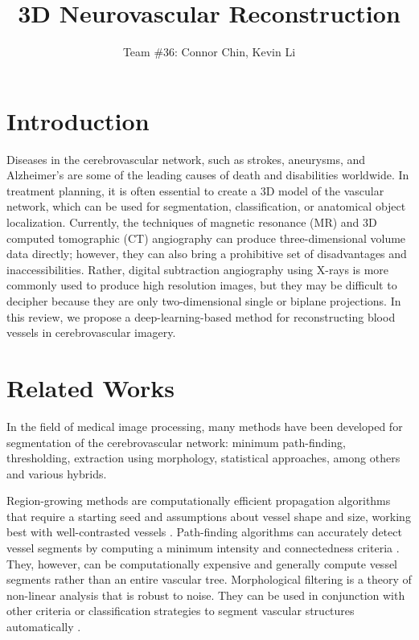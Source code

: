 \documentclass[letterpaper, 10 pt, journal]{ieeeconf}
\title{\LARGE \bf 3D Neurovascular Reconstruction}
\author{Team \#36: Connor Chin, Kevin Li}
\begin{document}
\maketitle
\thispagestyle{empty}
\pagestyle{empty}

\section{Introduction}

Diseases in the cerebrovascular network, such as strokes, aneurysms, and Alzheimer’s are some of the leading causes of death and disabilities worldwide.
In treatment planning, it is often essential to create a 3D model of the vascular network, which can be used for segmentation, classification, or anatomical object localization.
Currently, the techniques of magnetic resonance (MR) and 3D computed tomographic (CT) angiography can produce three-dimensional volume data directly;
however, they can also bring a prohibitive set of disadvantages and inaccessibilities.
Rather, digital subtraction angiography using X-rays is more commonly used to produce high resolution images, but they may be difficult to decipher because they are only two-dimensional single or biplane projections.
In this review, we propose a deep-learning-based method for reconstructing blood vessels in cerebrovascular imagery.


\section{Related Works}

In the field of medical image processing, many methods have been developed for segmentation of the cerebrovascular network: minimum path-finding, thresholding, extraction using morphology, statistical approaches, among others and various hybrids.

Region-growing methods are computationally efficient propagation algorithms that require a starting seed and assumptions about vessel shape and size, working best with well-contrasted vessels \cite{region_growing}.
Path-finding algorithms can accurately detect vessel segments by computing a minimum intensity and connectedness criteria \cite{path_finding}.
They, however, can be computationally expensive and generally compute vessel segments rather than an entire vascular tree.
Morphological filtering is a theory of non-linear analysis that is robust to noise.
They can be used in conjunction with other criteria or classification strategies to segment vascular structures automatically \cite{morphology}.
\end{document}
